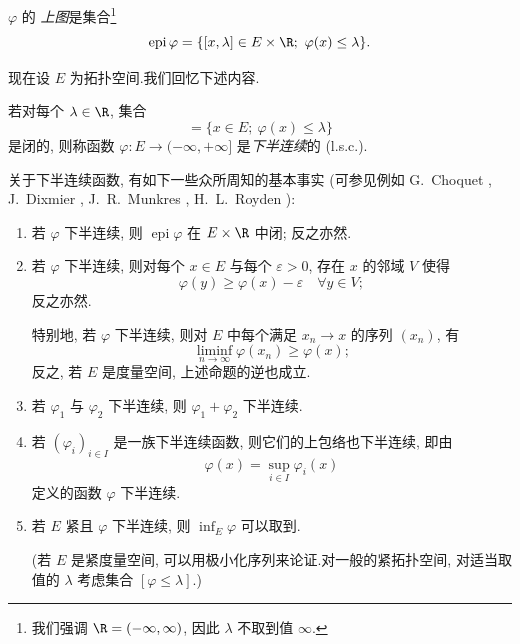 \begin{notation}
$\varphi$ 的\emph{
上图}是集合\footnote{我们强调 $\R=(-\infty,\infty)$, 因此 $\lambda$
不取到值 $\infty$.}
\begin{equation*}
\operatorname{epi}\varphi=\{[x,\lambda]\in E\times\R;\ \varphi(x)\le\lambda\}.
\end{equation*}
\end{notation}

现在设 $E$ 为拓扑空间.我们回忆下述内容.

\begin{definition}
若对每个 $\lambda\in\R$, 集合
\begin{equation*}
[\varphi\le\lambda]=\{x\in E;\ \varphi(x)\le\lambda\}
\end{equation*}
是闭的, 则称函数 $\varphi:E\to(-\infty,+\infty]$ 是\emph{下半连续}的 (l.s.c.).
\end{definition}

关于下半连续函数, 有如下一些众所周知的基本事实 (可参见例如 G.~Choquet
, J.~Dixmier , J.~R.~Munkres , H.~L.~Royden ):

\begin{enumerate}[label=\arabic*., leftmargin=2.2em, itemsep=0.25em]
	\item 若 $\varphi$ 下半连续, 则 $\operatorname{epi}\varphi$ 在 $E\times\R$ 中闭;
	      反之亦然.
	\item 若 $\varphi$ 下半连续, 则对每个 $x\in E$ 与每个 $\varepsilon>0$, 存在 $x$ 的邻域
	      $V$ 使得
	      \begin{equation*}
	      \varphi(y)\ge\varphi(x)-\varepsilon\quad \forall y\in V;
	      \end{equation*}
	      反之亦然.

	      特别地, 若 $\varphi$ 下半连续, 则对 $E$ 中每个满足 $x_n\to x$ 的序列 $(x_n)$, 有
	      \begin{equation*}
	      \liminf_{n\to\infty}\varphi(x_n)\ge\varphi(x);
	      \end{equation*}
	      反之, 若 $E$ 是度量空间, 上述命题的逆也成立.
	\item 若 $\varphi_1$ 与 $\varphi_2$ 下半连续, 则 $\varphi_1+\varphi_2$ 下半连续.
	\item 若 $(\varphi_i)_{i\in I}$ 是一族下半连续函数, 则它们的上包络也下半连续, 即由
	      \begin{equation*}
	      \varphi(x)=\sup_{i\in I}\varphi_i(x)
	      \end{equation*}
	      定义的函数 $\varphi$ 下半连续.
	\item 若 $E$ 紧且 $\varphi$ 下半连续, 则 $\inf_E\varphi$ 可以取到.

	      (若 $E$ 是紧度量空间, 可以用极小化序列来论证.对一般的紧拓扑空间,
	      对适当取值的 $\lambda$ 考虑集合 $[\varphi\le\lambda]$.)
\end{enumerate}

